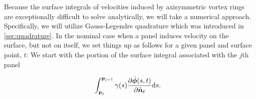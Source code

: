 Because the surface integrals of velocities induced by axisymmetric vortex rings are exceptionally difficult to solve analytically, we will take a numerical approach.
%
Specifically, we will utilize Gauss-Legendre quadrature which was introduced in \cref{sec:quadrature}.
%
%
%
In the nominal case when a panel induces velocity on the surface, but not on itself, we set things up as follows for a given panel and surface point, \(t\):
%
We start with the portion of the surface integral associated with the \(j\)th panel

\begin{equation}
    \int_{\bm{p}_j}^{\bm{p}_{j+1}} \gamma(s) \frac{\partial \hat{\bm{\phi}}(s,t)}{\partial \hat{\bm{n}}_t} \mathrm{d} s.
\end{equation}

